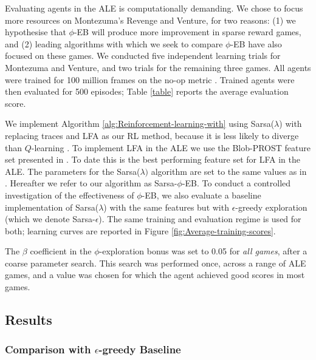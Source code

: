 \documentclass{article}
\theoremstyle{definition}
\theoremstyle{definition}
\theoremstyle{plain}
\theoremstyle{plain}
\theoremstyle{plain}
\begin{document}
Evaluating agents in the ALE is computationally demanding. We chose
to focus more resources on Montezuma's Revenge and Venture, for two
reasons: (1) we hypothesise that $\phi$-EB will produce more improvement
in sparse reward games, and (2) leading algorithms with which we seek
to compare $\phi$-EB have also focused on these games. We conducted
five independent learning trials for Montezuma and Venture, and two
trials for the remaining three games. All agents were trained for
100 million frames on the no-op metric \cite{BNVB:2013ale}. Trained
agents were then evaluated for 500 episodes; Table \ref{table} reports
the average evaluation score.

We implement Algorithm \ref{alg:Reinforcement-learning-with} using
Sarsa($\lambda$) with replacing traces and LFA as our RL method,
because it is less likely to diverge than $Q$-learning \cite{Sutton1998}.
To implement LFA in the ALE we use the Blob-PROST feature set presented
in \cite{LMTB:2015shallow}. To date this is the best performing feature
set for LFA in the ALE. The parameters for the Sarsa($\lambda)$ algorithm
are set to the same values as in \cite{LMTB:2015shallow}. Hereafter
we refer to our algorithm as Sarsa-$\phi$-EB. To conduct a controlled
investigation of the effectiveness of $\phi$-EB, we also evaluate
a baseline implementation of Sarsa($\lambda$) with the same features
but with $\epsilon$-greedy exploration (which we denote Sarsa-$\epsilon$).
The same training and evaluation regime is used for both; learning
curves are reported in Figure \ref{fig:Average-training-scores}. 

The $\beta$ coefficient in the $\phi$-exploration bonus was set
to 0.05 for \emph{all games}, after a coarse parameter search. This
search was performed once, across a range of ALE games, and a value
was chosen for which the agent achieved good scores in most games.


\subsection{Results}


\subsubsection*{Comparison with $\epsilon$-greedy Baseline}
\end{document}
